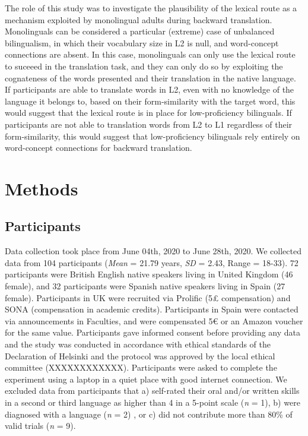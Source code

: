 \documentclass[
  english,
  man,floatsintext]{apa6}
\begin{document}
The role of this study was to investigate the plausibility of the lexical route as a mechanism exploited by monolingual adults during backward translation. Monolinguals can be considered a particular (extreme) case of unbalanced bilingualism, in which their vocabulary size in L2 is null, and word-concept connections are absent. In this case, monolinguals can only use the lexical route to suceeed in the translation task, and they can only do so by exploiting the cognateness of the words presented and their translation in the native language. If participants are able to translate words in L2, even with no knowledge of the language it belongs to, based on their form-similarity with the target word, this would suggest that the lexical route is in place for low-proficiency bilinguals. If participants are not able to translation words from L2 to L1 regardless of their form-similarity, this would suggest that low-proficiency bilinguals rely entirely on word-concept connections for backward translation.

\hypertarget{methods}{%
\section{Methods}\label{methods}}

\hypertarget{participants}{%
\subsection{Participants}\label{participants}}

Data collection took place from June 04th, 2020 to June 28th, 2020. We collected data from 104 participants (\emph{Mean} = 21.79 years, \emph{SD} = 2.43, Range = 18-33). 72 participants were British English native speakers living in United Kingdom (46 female), and 32 participants were Spanish native speakers living in Spain (27 female). Participants in UK were recruited via Prolific (5£ compensation) and SONA (compensation in academic credits). Participants in Spain were contacted via announcements in Faculties, and were compensated 5€ or an Amazon voucher for the same value. Participants gave informed consent before providing any data and the study was conducted in accordance with ethical standards of the Declaration of Helsinki and the protocol was approved by the local ethical committee (XXXXXXXXXXXX). Participants were asked to complete the experiment using a laptop in a quiet place with good internet connection. We excluded data from participants that a) self-rated their oral and/or written skills in a second or third language as higher than 4 in a 5-point scale (\emph{n} = 1), b) were diagnosed with a language (\emph{n} = 2) , or c) did not contribute more than 80\% of valid trials (\emph{n} = 9).
\end{document}

